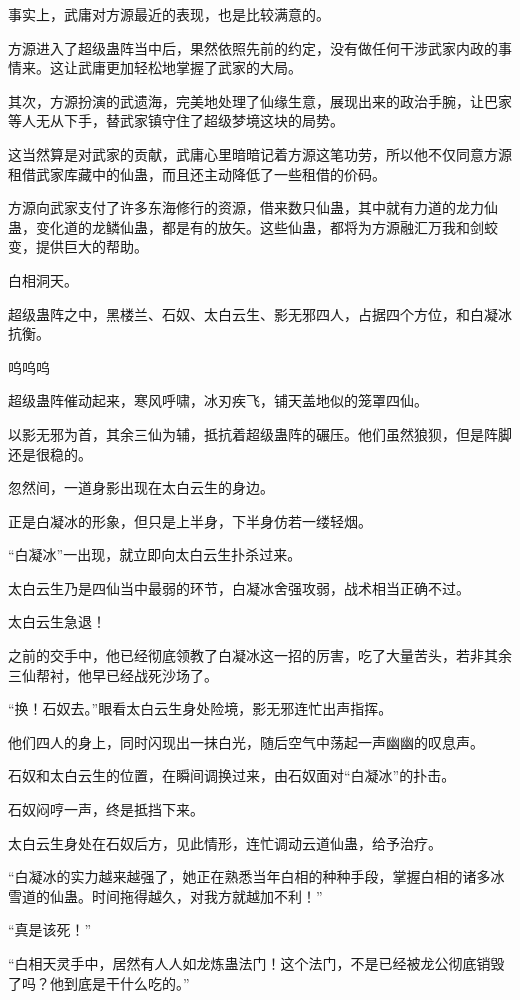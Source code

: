 \begin{this_body}
事实上，武庸对方源最近的表现，也是比较满意的。

方源进入了超级蛊阵当中后，果然依照先前的约定，没有做任何干涉武家内政的事情来。这让武庸更加轻松地掌握了武家的大局。

其次，方源扮演的武遗海，完美地处理了仙缘生意，展现出来的政治手腕，让巴家等人无从下手，替武家镇守住了超级梦境这块的局势。

这当然算是对武家的贡献，武庸心里暗暗记着方源这笔功劳，所以他不仅同意方源租借武家库藏中的仙蛊，而且还主动降低了一些租借的价码。

方源向武家支付了许多东海修行的资源，借来数只仙蛊，其中就有力道的龙力仙蛊，变化道的龙鳞仙蛊，都是有的放矢。这些仙蛊，都将为方源融汇万我和剑蛟变，提供巨大的帮助。

白相洞天。

超级蛊阵之中，黑楼兰、石奴、太白云生、影无邪四人，占据四个方位，和白凝冰抗衡。

呜呜呜

超级蛊阵催动起来，寒风呼啸，冰刃疾飞，铺天盖地似的笼罩四仙。

以影无邪为首，其余三仙为辅，抵抗着超级蛊阵的碾压。他们虽然狼狈，但是阵脚还是很稳的。

忽然间，一道身影出现在太白云生的身边。

正是白凝冰的形象，但只是上半身，下半身仿若一缕轻烟。

“白凝冰”一出现，就立即向太白云生扑杀过来。

太白云生乃是四仙当中最弱的环节，白凝冰舍强攻弱，战术相当正确不过。

太白云生急退！

之前的交手中，他已经彻底领教了白凝冰这一招的厉害，吃了大量苦头，若非其余三仙帮衬，他早已经战死沙场了。

“换！石奴去。”眼看太白云生身处险境，影无邪连忙出声指挥。

他们四人的身上，同时闪现出一抹白光，随后空气中荡起一声幽幽的叹息声。

石奴和太白云生的位置，在瞬间调换过来，由石奴面对“白凝冰”的扑击。

石奴闷哼一声，终是抵挡下来。

太白云生身处在石奴后方，见此情形，连忙调动云道仙蛊，给予治疗。

“白凝冰的实力越来越强了，她正在熟悉当年白相的种种手段，掌握白相的诸多冰雪道的仙蛊。时间拖得越久，对我方就越加不利！”

“真是该死！”

“白相天灵手中，居然有人人如龙炼蛊法门！这个法门，不是已经被龙公彻底销毁了吗？他到底是干什么吃的。”


\end{this_body}

